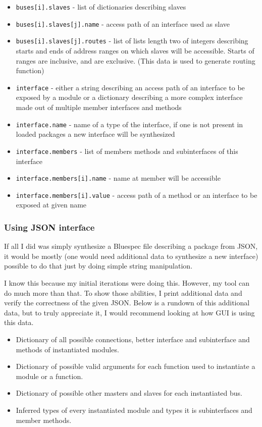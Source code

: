 \documentclass[12pt]{report}
\begin{document}
\begin{itemize}
   \item \verb!buses[i].slaves! - list of dictionaries describing slaves 
   \item \verb!buses[i].slaves[j].name! - access path of an interface used as slave 
   \item \verb!buses[i].slaves[j].routes! - list of lists length two of integers describing starts and ends of address ranges on which slaves will be accessible. Starts of ranges are inclusive, and are exclusive. (This data is used to generate routing function) 
   \item \verb!interface! - either a string describing an access path of an interface to be exposed by a module or a dictionary describing a more complex interface made out of multiple member interfaces and methods 
   \item \verb!interface.name! - name of a type of the interface, if one is not present in loaded packages a new interface will be synthesized 
   \item \verb!interface.members! - list of members methods and subinterfaces of this interface 
   \item \verb!interface.members[i].name! - name at member will be accessible 
   \item \verb!interface.members[i].value! - access path of a method or an interface to be exposed at given name  
\end{itemize} 


\subsubsection{Using JSON interface}

If all I did was simply synthesize a Bluespec file describing a package from JSON, it would be mostly (one would need additional data to synthesize a new interface) possible to do that just by doing simple string manipulation.

I know this because my initial iterations were doing this. However, my tool can do much more than that. To show those abilities, I print additional data and verify the correctness of the given JSON. Below is a rundown of this additional data, but to truly appreciate it, I would recommend looking at how GUI is using this data.

\begin{itemize}
\item Dictionary of all possible connections, better interface and subinterface and methods of instantiated modules.
\item Dictionary of possible valid arguments for each function used to instantiate a module or a function. 
\item Dictionary of possible other masters and slaves for each instantiated bus.
\item Inferred types of every instantiated module and types it is subinterfaces and member methods.
\end{itemize} 
\end{document}
